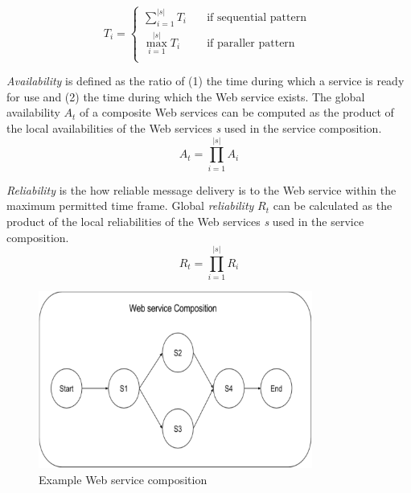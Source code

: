 \begin{equation}
T_i = \left\{
\begin{split}
    \sum_{i=1}^{|s|} T_i      & \quad \text{if sequential pattern  } \\
    \max_{i=1}^{|s|} T_i      & \quad \text{if paraller pattern } \\
\end{split}\right. 
\end{equation}

\emph{Availability} is defined as the ratio of (1) the time during which a service is ready for use and (2) the time during which the Web service exists. The global availability \emph{$A_t$} of a composite Web services can be computed as the product of the local availabilities of the Web services \emph{s} used in the service composition.
\begin{equation}
 A_t = \prod_{i=1}^{|s|} A_i
\end{equation}

\emph{Reliability} is the how reliable message delivery is to the Web service within the maximum permitted time frame. Global \emph{reliability} \emph{$R_t$} can be calculated as the product of the local reliabilities of the Web services \emph{s} used in the service composition.
\begin{equation}
 R_t = \prod_{i=1}^{|s|} R_i
\end{equation}


\begin{figure}[H]
\includegraphics[width=9cm]{Figure2-1ExampleWebServiceComposition.pdf}
\centering
\caption{Example Web service composition}
\end{figure} 


